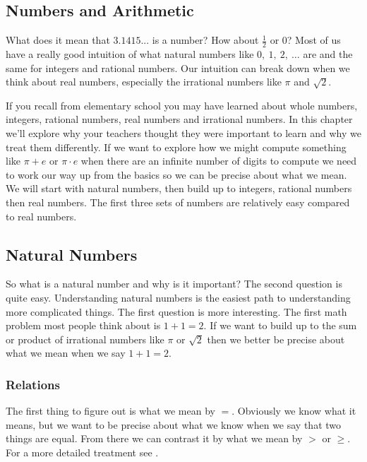 \documentclass[oneside]{book}
\begin{document}
\begin{spacing}{1.618}
\appendix
\chapter{Numbers and Arithmetic}\label{appendix:numbers_and_arithmetic}

What does it mean that $3.1415...$ is a number? How about $\frac{1}{2}$ or $0$? Most of us have a really good intuition of what natural numbers like $0,~1,~2,~\dots$ are and the same for integers and rational numbers. Our intuition can break down when we think about real numbers, especially the irrational numbers like $\pi$ and $\sqrt{2}$. 

If you recall from elementary school you may have learned about whole numbers, integers, rational numbers, real numbers and irrational numbers. In this chapter we'll explore why your teachers thought they were important to learn and why we treat them differently. If we want to explore how we might compute something like $\pi+e$ or $\pi\cdot e$ when there are an infinite number of digits to compute we need to work our way up from the basics so we can be precise about what we mean. We will start with natural numbers, then build up to integers, rational numbers then real numbers. The first three sets of numbers are relatively easy compared to real numbers.

\section{Natural Numbers}
So what is a natural number and why is it important? The second question is quite easy. Understanding natural numbers is the easiest path to understanding more complicated things. The first question is more interesting. The first math problem most people think about is $1+1=2$. If we want to build up to the sum or product of irrational numbers like $\pi$ or $\sqrt{2}$ then we better be precise about what we mean when we say $1+1=2$. 

\subsection{Relations}

The first thing to figure out is what we mean by $=$. Obviously we know what it means, but we want to be precise about what we know when we say that two things are equal. From there we can contrast it by what we mean by $>$ or $\geq$. For a more detailed treatment see \cite{enderton77}. 


\end{spacing}
\end{document}
